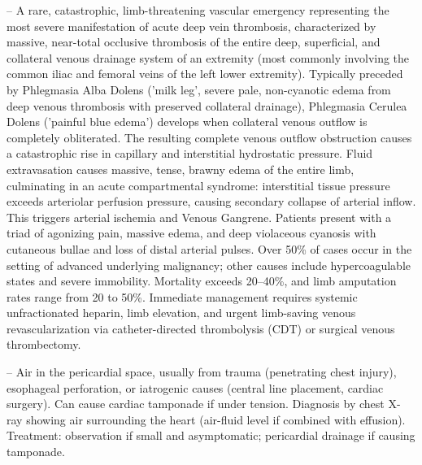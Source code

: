 -- A rare, catastrophic, limb-threatening vascular emergency representing the most severe manifestation of acute deep vein thrombosis, characterized by massive, near-total occlusive thrombosis of the entire deep, superficial, and collateral venous drainage system of an extremity (most commonly involving the common iliac and femoral veins of the left lower extremity). Typically preceded by Phlegmasia Alba Dolens ('milk leg', severe pale, non-cyanotic edema from deep venous thrombosis with preserved collateral drainage), Phlegmasia Cerulea Dolens ('painful blue edema') develops when collateral venous outflow is completely obliterated. The resulting complete venous outflow obstruction causes a catastrophic rise in capillary and interstitial hydrostatic pressure. Fluid extravasation causes massive, tense, brawny edema of the entire limb, culminating in an acute compartmental syndrome: interstitial tissue pressure exceeds arteriolar perfusion pressure, causing secondary collapse of arterial inflow. This triggers arterial ischemia and Venous Gangrene. Patients present with a triad of agonizing pain, massive edema, and deep violaceous cyanosis with cutaneous bullae and loss of distal arterial pulses. Over 50\% of cases occur in the setting of advanced underlying malignancy; other causes include hypercoagulable states and severe immobility. Mortality exceeds 20--40\%, and limb amputation rates range from 20 to 50\%. Immediate management requires systemic unfractionated heparin, limb elevation, and urgent limb-saving venous revascularization via catheter-directed thrombolysis (CDT) or surgical venous thrombectomy.

-- Air in the pericardial space, usually from trauma (penetrating chest injury), esophageal perforation, or iatrogenic causes (central line placement, cardiac surgery). Can cause cardiac tamponade if under tension. Diagnosis by chest X-ray showing air surrounding the heart (air-fluid level if combined with effusion). Treatment: observation if small and asymptomatic; pericardial drainage if causing tamponade.

